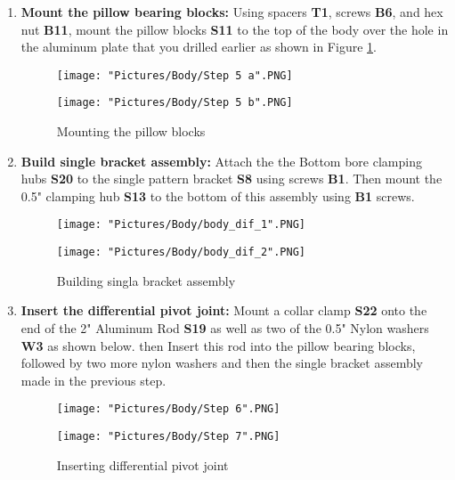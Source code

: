 \documentclass[12pt]{article}
\begin{document}
\begin{enumerate}
\item \textbf{Mount the pillow bearing blocks:} Using spacers \textbf{T1}, screws \textbf{B6}, and hex nut \textbf{B11}, mount the pillow blocks \textbf{S11} to the top of the body over the hole in the aluminum plate that you drilled earlier as shown in Figure \ref{mount pillow blocks}.

\begin{figure}[H]
  \centering
  \begin{minipage}[b]{0.30\textwidth}
    \texttt{[image: "Pictures/Body/Step 5 a".PNG]}
  \end{minipage}
  \hfill
  \begin{minipage}[b]{0.55\textwidth}
    \texttt{[image: "Pictures/Body/Step 5 b".PNG]}
  \end{minipage}
  \caption{Mounting the pillow blocks}
  \label{mount pillow blocks}
\end{figure}

\item \textbf{Build single bracket assembly:} Attach the the Bottom bore clamping hubs \textbf{S20} to the single pattern bracket \textbf{S8} using screws \textbf{B1}. Then mount the 0.5" clamping hub \textbf{S13} to the bottom of this assembly using \textbf{B1} screws. 

\begin{figure}[H]
  \centering
  \begin{minipage}[b]{0.45\textwidth}
    \texttt{[image: "Pictures/Body/body\_dif\_1".PNG]}
  \end{minipage}
  \hfill
  \begin{minipage}[b]{0.45\textwidth}
    \texttt{[image: "Pictures/Body/body\_dif\_2".PNG]}
  \end{minipage}
  \caption{Building singla bracket assembly}
  \label{single_bracket}
\end{figure}

\item \textbf{Insert the differential pivot joint:} Mount a collar clamp \textbf{S22} onto the end of the 2" Aluminum Rod \textbf{S19} as well as two of the 0.5" Nylon washers \textbf{W3} as shown below. then Insert this rod into the pillow bearing blocks, followed by two more nylon washers and then the single bracket assembly made in the previous step.

\begin{figure}[H]
  \centering
  \begin{minipage}[b]{0.45\textwidth}
    \texttt{[image: "Pictures/Body/Step 6".PNG]}
  \end{minipage}
  \hfill
  \begin{minipage}[b]{0.45\textwidth}
    \texttt{[image: "Pictures/Body/Step 7".PNG]}
  \end{minipage}
  \caption{Inserting differential pivot joint}
  \label{diff_pivot_joint}
\end{figure}

\end{enumerate}
\end{document}
